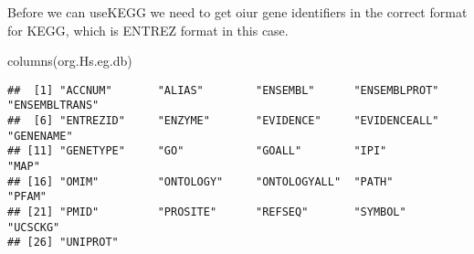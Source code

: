 \documentclass[
]{article}
\newenvironment{Shaded}{\begin{snugshade}}{\end{snugshade}}
\newcommand{\AttributeTok}[1]{\textcolor[rgb]{0.77,0.63,0.00}{#1}}
\newcommand{\FunctionTok}[1]{\textcolor[rgb]{0.00,0.00,0.00}{#1}}
\newcommand{\NormalTok}[1]{#1}
\newcommand{\OtherTok}[1]{\textcolor[rgb]{0.56,0.35,0.01}{#1}}
\newcommand{\SpecialCharTok}[1]{\textcolor[rgb]{0.00,0.00,0.00}{#1}}
\newcommand{\StringTok}[1]{\textcolor[rgb]{0.31,0.60,0.02}{#1}}
\begin{document}
Before we can useKEGG we need to get oiur gene identifiers in the
correct format for KEGG, which is ENTREZ format in this case.

\begin{Shaded}
\begin{Highlighting}[]
\FunctionTok{columns}\NormalTok{(org.Hs.eg.db)}
\end{Highlighting}
\end{Shaded}

\begin{verbatim}
##  [1] "ACCNUM"       "ALIAS"        "ENSEMBL"      "ENSEMBLPROT"  "ENSEMBLTRANS"
##  [6] "ENTREZID"     "ENZYME"       "EVIDENCE"     "EVIDENCEALL"  "GENENAME"    
## [11] "GENETYPE"     "GO"           "GOALL"        "IPI"          "MAP"         
## [16] "OMIM"         "ONTOLOGY"     "ONTOLOGYALL"  "PATH"         "PFAM"        
## [21] "PMID"         "PROSITE"      "REFSEQ"       "SYMBOL"       "UCSCKG"      
## [26] "UNIPROT"
\end{verbatim}

\begin{Shaded}
\end{Shaded}
\end{document}
